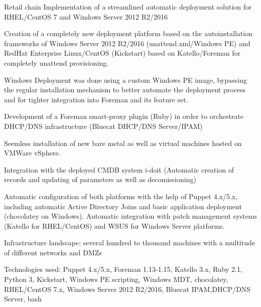 

\begin{cventries}
  \cventry
    {Retail chain}
    {Implementation of a streamlined automatic deployment solution for RHEL/CentOS 7 and Windows
      Server 2012 R2/2016}
    {}
    {}
    {
      \begin{cvitems}
      \item Creation of a completely new deployment platform based on the autoinstallation
        frameworks of Windows Server 2012 R2/2016 (unattend.xml/Windows PE) and RedHat Enterprise
        Linux/CentOS (Kickstart) based on Katello/Foreman for completely unattend provisioning.
      \item Windows Deployment was done using a custom Windows PE image, bypassing the regular
        installation mechanism to better automate the deployment process and for tighter integration
        into Foreman and its feature set.
      \item Development of a Foreman smart-proxy plugin (Ruby) in order to orchestrate DHCP/DNS infrastructure (Bluecat DHCP/DNS Server/IPAM)
      \item Seemless installation of new bare metal as well as virtual machines hosted on VMWare vSphere.
      \item Integration with the deployed CMDB system i-doit (Automatic creation of records and
        updating of parameters as well as decomissioning)
      \item Automatic configuration of both
        platforms with the help of Puppet 4.x/5.x, including automatic Active Directory Joins and
        basic application deployment (chocolatey on Windows). Automatic integration with patch management
        systems (Katello for RHEL/CentOS) and WSUS for Windows Server platforms.
      \item Infrastructure landscape: several hundred to thousand machines with a multitude of
        different networks and DMZs
      \item Technologies used: Puppet 4.x/5.x, Foreman 1.13-1.15, Katello 3.x, Ruby 2.1, Python 3, Kickstart, Windows PE scripting, Windows
        MDT, chocolatey, RHEL/CentOS 7.x, Windows Server 2012 R2/2016, Bluecat IPAM,DHCP/DNS Server,
        bash
      \end{cvitems}
    }


\end{cventries}

